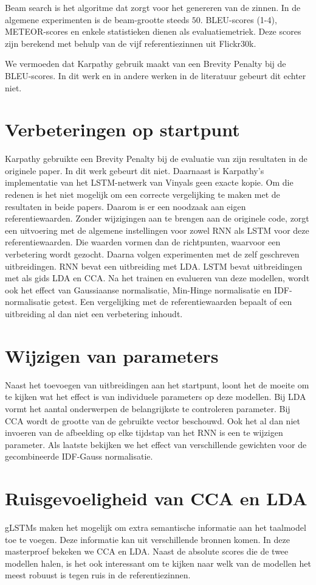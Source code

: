 Beam search is het algoritme dat zorgt voor het genereren van de zinnen. In de algemene experimenten is de beam-grootte steeds $50$.
BLEU-scores (1-4), METEOR-scores en enkele statistieken dienen als evaluatiemetriek. Deze scores zijn berekend met behulp van de vijf referentiezinnen uit Flickr30k.

We vermoeden dat Karpathy gebruik maakt van een Brevity Penalty bij de BLEU-scores. In dit werk en in andere werken in de literatuur gebeurt dit echter niet.

\section{Verbeteringen op startpunt}
Karpathy gebruikte een Brevity Penalty bij de evaluatie van zijn resultaten in de originele paper. In dit werk gebeurt dit niet. Daarnaast is Karpathy's implementatie van het LSTM-netwerk van Vinyals geen exacte kopie. Om die redenen is het niet mogelijk om een correcte vergelijking te maken met de resultaten in beide papers. Daarom is er een noodzaak aan eigen referentiewaarden. Zonder wijzigingen aan te brengen aan de originele code, zorgt een uitvoering met de algemene instellingen voor zowel RNN als LSTM voor deze referentiewaarden. Die waarden vormen dan de richtpunten, waarvoor een verbetering wordt gezocht.
Daarna volgen experimenten met de zelf geschreven uitbreidingen. RNN bevat een uitbreiding met LDA. LSTM bevat uitbreidingen met als gids LDA en CCA.
Na het trainen en evalueren van deze modellen, wordt ook het effect van Gaussiaanse normalisatie, Min-Hinge normalisatie en IDF-normalisatie getest.
Een vergelijking met de referentiewaarden bepaalt of een uitbreiding al dan niet een verbetering inhoudt.

\section{Wijzigen van parameters}
Naast het toevoegen van uitbreidingen aan het startpunt, loont het de moeite om te kijken wat het effect is van individuele parameters op deze modellen. Bij LDA vormt het aantal onderwerpen de belangrijkste te controleren parameter. Bij CCA wordt de grootte van de gebruikte vector beschouwd. Ook het al dan niet invoeren van de afbeelding op elke tijdstap van het RNN is een te wijzigen parameter. Als laatste bekijken we het effect van verschillende gewichten voor de gecombineerde IDF-Gauss normalisatie.

\section{Ruisgevoeligheid van CCA en LDA} %
\label{sec:ruisgevoeligheid_van_cca_en_lda_exp}
gLSTMs maken het mogelijk om extra semantische informatie aan het taalmodel toe te voegen. Deze informatie kan uit verschillende bronnen komen. In deze masterproef bekeken we CCA en LDA. Naast de absolute scores die de twee modellen halen, is het ook interessant om te kijken naar welk van de modellen het meest robuust is tegen ruis in de referentiezinnen.

